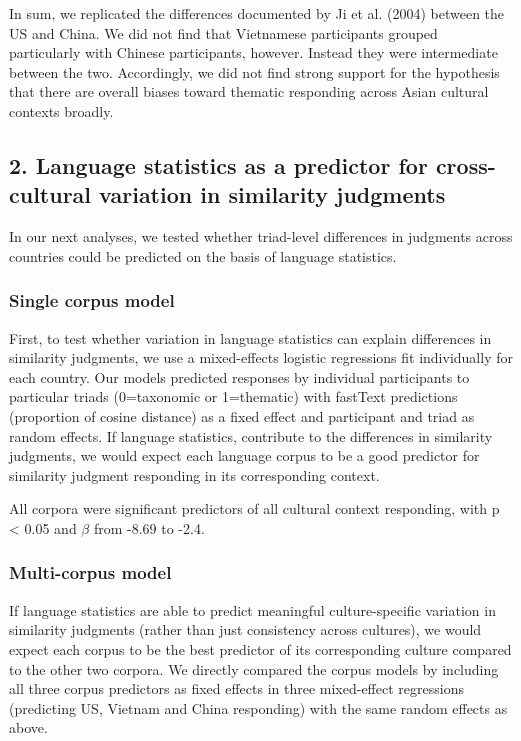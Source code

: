 \documentclass[10pt, letterpaper]{article}
\begin{document}
In sum, we replicated the differences documented by Ji et al. (2004)
between the US and China. We did not find that Vietnamese participants
grouped particularly with Chinese participants, however. Instead they
were intermediate between the two. Accordingly, we did not find strong
support for the hypothesis that there are overall biases toward thematic
responding across Asian cultural contexts broadly.

\hypertarget{language-statistics-as-a-predictor-for-cross-cultural-variation-in-similarity-judgments}{%
\subsection{2. Language statistics as a predictor for cross-cultural
variation in similarity
judgments}\label{language-statistics-as-a-predictor-for-cross-cultural-variation-in-similarity-judgments}}

In our next analyses, we tested whether triad-level differences in
judgments across countries could be predicted on the basis of language
statistics.

\hypertarget{single-corpus-model}{%
\subsubsection{Single corpus model}\label{single-corpus-model}}

First, to test whether variation in language statistics can explain
differences in similarity judgments, we use a mixed-effects logistic
regressions fit individually for each country. Our models predicted
responses by individual participants to particular triads (0=taxonomic
or 1=thematic) with fastText predictions (proportion of cosine distance)
as a fixed effect and participant and triad as random effects. If
language statistics, contribute to the differences in similarity
judgments, we would expect each language corpus to be a good predictor
for similarity judgment responding in its corresponding context.

All corpora were significant predictors of all cultural context
responding, with p \textless{} 0.05 and \(\beta\) from -8.69 to -2.4.

\hypertarget{multi-corpus-model}{%
\subsubsection{Multi-corpus model}\label{multi-corpus-model}}

If language statistics are able to predict meaningful culture-specific
variation in similarity judgments (rather than just consistency across
cultures), we would expect each corpus to be the best predictor of its
corresponding culture compared to the other two corpora. We directly
compared the corpus models by including all three corpus predictors as
fixed effects in three mixed-effect regressions (predicting US, Vietnam
and China responding) with the same random effects as above.
\end{document}
